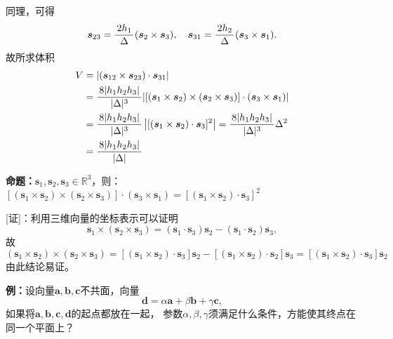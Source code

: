 同理，可得
$$\bm{s}_{23}=\displaystyle\frac{\,{2h_1}\,}{\,{\Delta}\,}(\bm{s}_2\times\bm{s}_3),\quad
\bm{s}_{31}=\displaystyle\frac{\,{2h_2}\,}{\,{\Delta}\,}(\bm{s}_3\times\bm{s}_1).$$
故所求体积
\begin{align*}
	V&=|(\bm{s}_{12}\times\bm{s}_{23})\cdot\bm{s}_{31}|\\
	&=\displaystyle\frac{\,{8|h_1h_2h_3|}\,}{\,{|\Delta|^3}\,}|[(\bm{s}_1\times\bm{s}_2)\times(\bm{s}_2\times\bm{s}_3)]
	\cdot(\bm{s}_3\times\bm{s}_1)|\\
	&=\displaystyle\frac{\,{8|h_1h_2h_3|}\,}{\,{|\Delta|^3}\,}
	\left|[(\bm{s}_1\times\bm{s}_2)\cdot\bm{s}_3]^2\right|
	=\displaystyle\frac{\,{8|h_1h_2h_3|}\,}{\,{|\Delta|^3}\,}\Delta^2\\
	&=\displaystyle\frac{\,{8|h_1h_2h_3|}\,}{\,{|\Delta|}\,}
\end{align*}
\fin

\begin{shaded}
	{\bf 命题：}$\bm{s}_1,\bm{s}_2,\bm{s}_3\in\mathbb{R}^3$，则：
	$\left[(\bm{s}_1\times\bm{s}_2)\times(\bm{s}_2\times\bm{s}_3)\right]
	\cdot(\bm{s}_3\times\bm{s}_1)=
	\left[(\bm{s}_1\times\bm{s}_2)\cdot\bm{s}_3\right]^2$
	
	[证]：利用三维向量的坐标表示可以证明
	$$\bm{s}_1\times(\bm{s}_2\times\bm{s}_3)
	=(\bm{s}_1\cdot\bm{s}_3)\bm{s}_2
	-(\bm{s}_1\cdot\bm{s}_2)\bm{s}_3,$$
	故
	$$(\bm{s}_1\times\bm{s}_2)\times(\bm{s}_2\times\bm{s}_3)
	=[(\bm{s}_1\times\bm{s}_2)\cdot\bm{s}_3]\bm{s}_2
	-[(\bm{s}_1\times\bm{s}_2)\cdot\bm{s}_2]\bm{s}_3
	=[(\bm{s}_1\times\bm{s}_2)\cdot\bm{s}_3]\bm{s}_2$$
	由此结论易证。\fin
\end{shaded}


{\bf 例：}设向量$\bm{a},\bm{b},\bm{c}$不共面，向量
$$\bm{d}=\alpha\bm{a}+\beta\bm{b}+\gamma\bm{c},$$
如果将$\bm{a},\bm{b},\bm{c},\bm{d}$的起点都放在一起，
参数$\alpha,\beta,\gamma$须满足什么条件，方能使其终点在同一个平面上？


